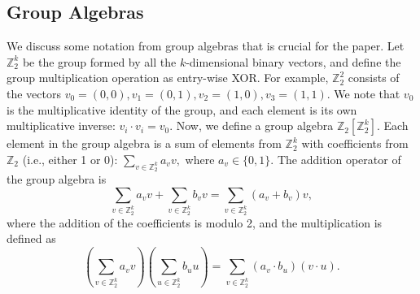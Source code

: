 \subsection{Group Algebras}
\label{sec:grpalgebra}
We discuss some notation from group algebras that is crucial for the paper. 
Let $\mathbb{Z}_2^k$ be the group formed by all the $k$-dimensional binary vectors, and define the group multiplication operation as entry-wise XOR. For example, $\mathbb{Z}_2^2$ consists of the vectors $v_0 = (0, 0), v_1 = (0, 1), v_2 = (1, 0), v_3 = (1, 1)$. We note that $v_0$ is the multiplicative identity of the group, and each element is its own multiplicative inverse: $v_i \cdot v_i = v_0$. Now, we define a group algebra $\mathbb{Z}_2[\mathbb{Z}_2^k]$. Each element in the group algebra is a sum of elements from $\mathbb{Z}_2^k$ with coefficients from $\mathbb{Z}_2$ (i.e., either 1 or 0):
$
\sum_{v\in \mathbb{Z}_2^k} a_v v,
$
where $a_v \in \{0,1\}$. The addition operator of the group algebra is
{\scriptsize
$$
\sum_{v\in \mathbb{Z}_2^k} a_v v + \sum_{v\in \mathbb{Z}_2^k} b_v v = \sum_{v\in \mathbb{Z}_2^k} (a_v + b_v) v,
$$}
where the addition of the coefficients is modulo 2, and the multiplication is defined as
{\scriptsize
$$
\left(\sum_{v\in \mathbb{Z}_2^k} a_v v\right)\left(\sum_{u\in \mathbb{Z}_2^k} b_u u\right) = \sum_{v\in \mathbb{Z}_2^k} (a_v \cdot b_u) (v\cdot u).
$$}


